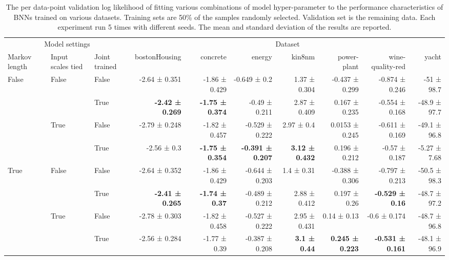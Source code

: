 {\begin{landscape}
		\clearpage
		
		\begin{table}
			\scriptsize
			\begin{tabular}{lll|rrrrrrr}
				\toprule
				\multicolumn{3}{c}{Model settings} & \multicolumn{7}{c}{Dataset} \\
				Markov length & Input scales tied & Joint trained & bostonHousing & concrete & energy & kin8nm & power-plant & wine-quality-red &   yacht \\
				\midrule
				\multirow{4}{*}{False} & \multirow{2}{*}{False} & False &            -2.64 ± 0.351 &  -1.86 ± 0.429 &    -0.649 ± 0.2 &  1.37 ± 0.304 &  -0.437 ± 0.299 &   -0.874 ± 0.246 &    -51 ± 98.7 \\
				&       & True  &            \textbf{-2.42 ± 0.269} &  \textbf{-1.75 ± 0.374} &   -0.49 ± 0.211 &  2.87 ± 0.409 &   0.167 ± 0.235 &   -0.554 ± 0.168 &  -48.9 ± 97.7 \\
				\cline{2-10}
				& \multirow{2}{*}{True} & False &            -2.79 ± 0.248 &  -1.82 ± 0.457 &  -0.529 ± 0.222 &    2.97 ± 0.4 &  0.0153 ± 0.245 &   -0.611 ± 0.169 &  -49.1 ± 96.8 \\
				&       & True  &              -2.56 ± 0.3 &  \textbf{-1.75 ± 0.354} &  \textbf{-0.391 ± 0.207} &  \textbf{3.12 ± 0.432} &   0.196 ± 0.212 &    -0.57 ± 0.187 &  -5.27 ± 7.68 \\
				\cline{1-10}
				\cline{2-10}
				\multirow{4}{*}{True} & \multirow{2}{*}{False} & False &            -2.64 ± 0.352 &  -1.86 ± 0.429 &  -0.644 ± 0.203 &    1.4 ± 0.31 &  -0.388 ± 0.306 &   -0.797 ± 0.213 &  -50.5 ± 98.3 \\
				&       & True  &            \textbf{-2.41 ± 0.265} &   \textbf{-1.74 ± 0.37} &  -0.489 ± 0.212 &  2.88 ± 0.412 &    0.197 ± 0.26 &    \textbf{-0.529 ± 0.16} &  -48.7 ± 97.2 \\
				\cline{2-10}
				& \multirow{2}{*}{True} & False &            -2.78 ± 0.303 &  -1.82 ± 0.458 &  -0.527 ± 0.222 &  2.95 ± 0.431 &     0.14 ± 0.13 &     -0.6 ± 0.174 &  -48.7 ± 96.8 \\
				&       & True  &            -2.56 ± 0.284 &   -1.77 ± 0.39 &  -0.387 ± 0.208 &    \textbf{3.1 ± 0.44} &   \textbf{0.245 ± 0.223} &   \textbf{-0.531 ± 0.161} &  -48.1 ± 96.9 \\
				\bottomrule
			\end{tabular}
			\caption{The per data-point validation log likelihood of fitting various combinations of model hyper-parameter to the performance characteristics of BNNs trained on various datasets. Training sets are 50\% of the samples randomly selected. Validation set is the remaining data. Each experiment run 5 times with different seeds. The mean and standard deviation of the results are reported.}
			\label{tbl:hyp_half}
		\end{table}
		

\end{landscape}}
